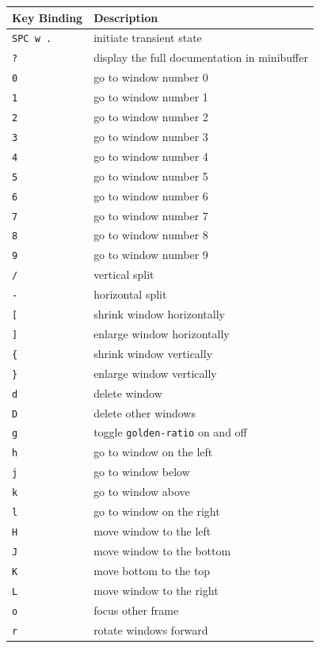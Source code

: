 \documentclass[11pt]{article}
\begin{document}
\begin{enumerate}
\begin{center}
\begin{tabular}{ll}
Key Binding & Description\\
\hline
\texttt{SPC w .} & initiate transient state\\
\texttt{?} & display the full documentation in minibuffer\\
\texttt{0} & go to window number 0\\
\texttt{1} & go to window number 1\\
\texttt{2} & go to window number 2\\
\texttt{3} & go to window number 3\\
\texttt{4} & go to window number 4\\
\texttt{5} & go to window number 5\\
\texttt{6} & go to window number 6\\
\texttt{7} & go to window number 7\\
\texttt{8} & go to window number 8\\
\texttt{9} & go to window number 9\\
\texttt{/} & vertical split\\
\texttt{-} & horizontal split\\
\texttt{[} & shrink window horizontally\\
\texttt{]} & enlarge window horizontally\\
\texttt{\{} & shrink window vertically\\
\texttt{\}} & enlarge window vertically\\
\texttt{d} & delete window\\
\texttt{D} & delete other windows\\
\texttt{g} & toggle \texttt{golden-ratio} on and off\\
\texttt{h} & go to window on the left\\
\texttt{j} & go to window below\\
\texttt{k} & go to window above\\
\texttt{l} & go to window on the right\\
\texttt{H} & move window to the left\\
\texttt{J} & move window to the bottom\\
\texttt{K} & move bottom to the top\\
\texttt{L} & move window to the right\\
\texttt{o} & focus other frame\\
\texttt{r} & rotate windows forward\\

\end{tabular}
\end{center}
\end{enumerate}
\end{document}
